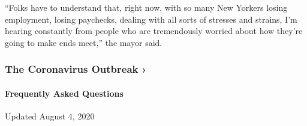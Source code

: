 ``Folks have to understand that, right now, with so many New Yorkers
losing employment, losing paychecks, dealing with all sorts of stresses
and strains, I'm hearing constantly from people who are tremendously
worried about how they're going to make ends meet,'' the mayor said.

\href{https://www.nytimes.com/news-event/coronavirus?action=click\&pgtype=Article\&state=default\&region=MAIN_CONTENT_3\&context=storylines_faq}{}

\hypertarget{the-coronavirus-outbreak-}{%
\subsubsection{The Coronavirus Outbreak
›}\label{the-coronavirus-outbreak-}}

\hypertarget{frequently-asked-questions}{%
\paragraph{Frequently Asked
Questions}\label{frequently-asked-questions}}

Updated August 4, 2020

